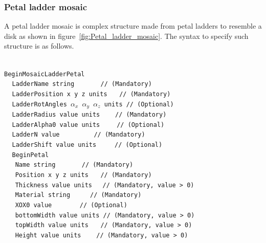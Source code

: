 \subsubsection{Petal ladder mosaic}

A petal ladder mosaic is complex structure made from petal ladders to resemble a disk as shown in figure~\ref{fig:Petal_ladder_mosaic}.
The syntax to specify such structure is as follows.

~\\
\noindent
{\tt BeginMosaicLadderPetal} \\
$~~~~~${\tt LadderName        string                   $~~~~~~~~~~~~$   // (Mandatory)} \\
$~~~~~${\tt LadderPosition    x  y  z units                     $~~~$   // (Mandatory)} \\
$~~~~~${\tt LadderRotAngles   $\alpha_x$  $\alpha_y$  $\alpha_z$ units  // (Optional)}  \\
$~~~~~${\tt LadderRadius      value units                    $~~~~~$    // (Mandatory)} \\
$~~~~~${\tt LadderAlpha0      value units                   $~~~~~~$    // (Optional)} \\
$~~~~~${\tt LadderN           value              $~~~~~~~~~~~~~~~~~$    // (Mandatory)} \\
$~~~~~${\tt LadderShift       value units                  $~~~~~~~$    // (Optional)} \\
$~~~~~${\tt BeginPetal} \\
$~~~~~~~${\tt Name             string                   $~~~~~~~~~~~~$   // (Mandatory)} \\
$~~~~~~~${\tt Position         x  y  z units                     $~~~$   // (Mandatory)} \\
$~~~~~~~${\tt Thickness        value  units                       $~~$   // (Mandatory, value > 0)} \\
$~~~~~~~${\tt Material         string                       $~~~~~~~~$   // (Mandatory)} \\
$~~~~~~~${\tt XOX0             value                   $~~~~~~~~~~~~~$   // (Optional)}  \\
$~~~~~~~${\tt bottomWidth      value units                               // (Mandatory, value > 0)} \\
$~~~~~~~${\tt topWidth         value units                       $~~~$   // (Mandatory, value > 0)} \\
$~~~~~~~${\tt Height           value units                     $~~~~~$   // (Mandatory, value > 0)} \\
